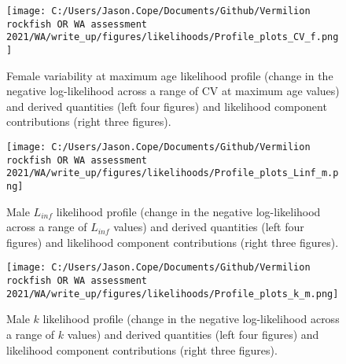 \documentclass[11pt,
  english,
  a4paper,
]{article}
\begin{document}
\begin{figure}
\centering
\texttt{[image: C:/Users/Jason.Cope/Documents/Github/Vermilion rockfish OR WA assessment 2021/WA/write\_up/figures/likelihoods/Profile\_plots\_CV\_f.png]}
\caption{Female variability at maximum age likelihood profile (change in the negative log-likelihood across a range of CV at maximum age values) and derived quantities (left four figures) and likelihood component contributions (right three figures).\label{fig:CVold_f-profile-combo}}
\end{figure}

\tagmcend\tagstructend


\begin{figure}
\centering
\texttt{[image: C:/Users/Jason.Cope/Documents/Github/Vermilion rockfish OR WA assessment 2021/WA/write\_up/figures/likelihoods/Profile\_plots\_Linf\_m.png]}
\caption{Male {\(L_{inf}\)\leavevmode\tagmcend\tagstructend} likelihood profile (change in the negative log-likelihood across a range of {\(L_{inf}\)\leavevmode\tagmcend\tagstructend} values) and derived quantities (left four figures) and likelihood component contributions (right three figures).\label{fig:Linf_M-profile-combo}}
\end{figure}

\tagmcend\tagstructend


\begin{figure}
\centering
\texttt{[image: C:/Users/Jason.Cope/Documents/Github/Vermilion rockfish OR WA assessment 2021/WA/write\_up/figures/likelihoods/Profile\_plots\_k\_m.png]}
\caption{Male {\(k\)\leavevmode\tagmcend\tagstructend} likelihood profile (change in the negative log-likelihood across a range of {\(k\)\leavevmode\tagmcend\tagstructend} values) and derived quantities (left four figures) and likelihood component contributions (right three figures).\label{fig:k_m-profile-combo}}
\end{figure}
\end{document}
